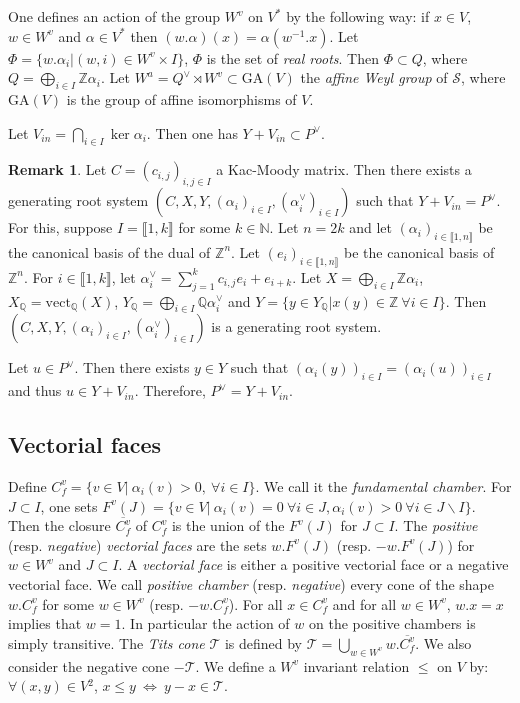 \documentclass[12pt]{article}
\theoremstyle{plain}
\theoremstyle{definition}
\newtheorem{rque}[thm]{Remark}
\newcommand{\N}{\mathbb{N}}
\newcommand{\Z}{\mathbb{Z}}
\newcommand{\Q}{\mathbb{Q}}
\begin{document}
One defines an action of the group $W^v$ on $V^*$ by the following way: if $x\in V$, $w\in W^v$ and $\alpha\in V^*$ then $(w.\alpha)(x)=\alpha(w^{-1}.x)$. Let $\Phi=\{w.\alpha_i|(w,i)\in W^v\times I\}$, $\Phi$ is the set of \textit{real roots}. Then $\Phi\subset Q$, where $Q=\bigoplus_{i\in I}\Z\alpha_i$. Let $W^a=Q^\vee\rtimes W^v\subset\mathrm{GA}(V\mathrm{})$ the \textit{affine Weyl group} of $\mathcal{S}$, where $\mathrm{GA}(V\mathrm{})$ is the group of affine isomorphisms of $V$.




Let $V_{in}=\bigcap_{i\in I}\ker \alpha_i$. Then one has $Y+V_{in}\subset P^\vee$. 


\begin{rque}\label{rque changement de syst de racines}
Let $C=(c_{i,j})_{i,j\in I}$ a Kac-Moody matrix. Then there exists a generating root system $(C,X,Y,(\alpha_i)_{i\in I},(\alpha_i^\vee)_{i\in I})$ such that $Y+V_{in}=P^\vee$. For this, suppose $I=\llbracket 1,k\rrbracket$ for some $k\in \N$. Let $n=2k$ and let $(\alpha_i)_{i\in \llbracket 1,n\rrbracket }$ be the canonical basis of the dual of $\Z^n$. Let $(e_i)_{i\in \llbracket 1,n\rrbracket }$ be the canonical basis of $\Z^n$. For $i\in \llbracket 1,k\rrbracket$, let $\alpha_i^\vee=\sum_{j=1}^k c_{i,j}e_i+e_{i+k}$. Let $X=\bigoplus_{i\in I}\Z\alpha_i$, $X_\Q=\mathrm{vect}_\Q(X)$, $Y_\Q=\bigoplus_{i\in I}\Q\alpha_i^\vee$ and $Y=\{y\in Y_\Q|x(y)\in \Z\ \forall i\in I\}$. Then $(C,X,Y,(\alpha_i)_{i\in I},(\alpha_i^\vee)_{i\in I})$ is a generating root system.

Let $u\in P^\vee$. Then there exists $y\in Y$ such that $(\alpha_i(y))_{i\in I}=(\alpha_i(u))_{i\in I}$ and thus $u\in Y+V_{in}$. Therefore, $P^\vee=Y+V_{in}$.

\end{rque}

\subsection{Vectorial faces}

Define $C_f^v=\{v\in V|\  \alpha_i(v)>0,\ \forall i\in I\}$. We call it the \textit{fundamental chamber}. For $J\subset I$, one sets $F^v(J)=\{v\in V|\ \alpha_i(v)=0\ \forall i\in J,\alpha_i(v)>0\ \forall i\in J\backslash I\}$. Then the closure $\overline{C_f^v}$ of $C_f^v$ is the union of the $F^v(J)$ for $J\subset I$. The \textit{positive} (resp. \textit{negative}) \textit{vectorial faces} are the sets $w.F^v(J)$ (resp. $-w.F^v(J)$) for $w\in W^v$  and $J\subset I$. A \textit{vectorial face} is either a positive vectorial face or a negative vectorial face. We call \textit{positive chamber} (resp. \textit{negative}) every cone  of the shape $w.C_f^v$ for some $w\in W^v$ (resp. $-w.C_f^v$).  For all $x\in C_f^v$ and for all $w\in W^v$, $w.x=x$ implies that $w=1$. In particular the action of $w$ on the positive chambers is simply transitive. The \textit{Tits cone} $\mathcal T$ is defined by $\mathcal{T}=\bigcup_{w\in W^v} w.\overline{C^v_f}$. We also consider the negative cone $-\mathcal{T}$.
We define a $W^v$ invariant relation $\leq$ on $V$ by: $\forall (x,y)\in V\mathrm{}^2$, $x\leq y\ \Leftrightarrow\ y-x\in \mathcal{T}$.
\end{document}

